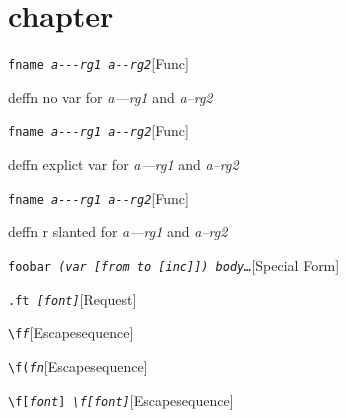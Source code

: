 \documentclass{book}
\begin{document}
\label{anchor:Top}%
\chapter{chapter}
\label{anchor:chapter}%

\noindent\texttt{fname \EmbracOn{}\textsl{a{-}{-}{-}rg1 a{-}{-}rg2}}\hfill[Func]



%
deffn no var for \textsl{a---rg1} and \textsl{a--rg2}

\noindent\texttt{fname \EmbracOn{}\textsl{\EmbracOff{}\textsl{a{-}{-}{-}rg1}\EmbracOn{} \EmbracOff{}\textsl{a{-}{-}rg2}\EmbracOn{}}}\hfill[Func]



%
deffn explict var for \textsl{a---rg1} and \textsl{a--rg2}

\noindent\texttt{fname \EmbracOn{}\textsl{\EmbracOff{}\textnormal{\textsl{a{-}{-}{-}rg1}}\EmbracOn{} \EmbracOff{}\textnormal{\textsl{a{-}{-}rg2}}\EmbracOn{}}}\hfill[Func]



%
deffn r slanted for \textsl{a---rg1} and \textsl{a--rg2}

\noindent\texttt{foobar \EmbracOn{}\textsl{(var [from to [inc]]) body\dots{}\@}}\hfill[Special Form]



%

\noindent\texttt{\texttt{.ft} \EmbracOn{}\textsl{[\EmbracOff{}\textnormal{\textsl{font}}\EmbracOn{}]}}\hfill[Request]



%
\noindent\texttt{\texttt{\textbackslash{}f}\textnormal{\textsl{f}}\texttt{}}\hfill[Escape\hbox{}sequence]



%
\noindent\texttt{\texttt{\textbackslash{}f(}\textnormal{\textsl{fn}}\texttt{}}\hfill[Escape\hbox{}sequence]



%
\noindent\texttt{\texttt{\textbackslash{}f[}\textnormal{\textsl{font}}\texttt{]} \EmbracOn{}\textsl{\EmbracOff{}\texttt{\textbackslash{}f[}\EmbracOn{}\EmbracOff{}\textnormal{\textsl{font}}\EmbracOn{}\EmbracOff{}\texttt{]}\EmbracOn{}}}\hfill[Escape\hbox{}sequence]
\end{document}
